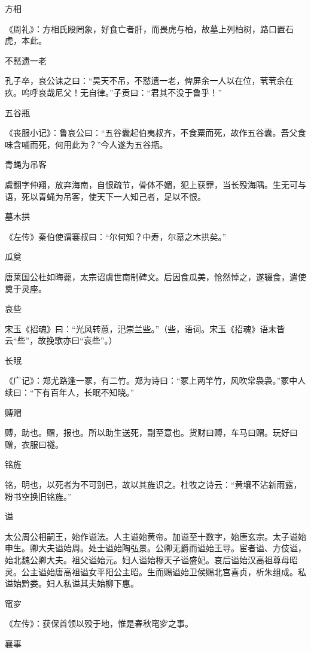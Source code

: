 \documentclass[a4paper,12pt,UTF8,twoside]{ctexbook}
\begin{document}
    方相
    
    《周礼》：方相氏殴罔象，好食亡者肝，而畏虎与柏，故墓上列柏树，路口置石虎，本此。
    
    不慭遗一老
    
    孔子卒，哀公诔之曰：“昊天不吊，不慭遗一老，俾屏余一人以在位，茕茕余在疚。呜呼哀哉尼父！无自律。”子贡曰：“君其不没于鲁乎！”
    
    五谷瓶
    
    《丧服小记》：鲁哀公曰：“五谷囊起伯夷叔齐，不食粟而死，故作五谷囊。吾父食味含哺而死，何用此为？”今人遂为五谷瓶。
    
    青蝇为吊客
    
    虞翻字仲翔，放弃海南，自恨疏节，骨体不媚，犯上获罪，当长殁海隅。生无可与语，死以青蝇为吊客，使天下一人知己者，足以不恨。
    
    墓木拱
    
    《左传》秦伯使谓褰叔曰：“尔何知？中寿，尔墓之木拱矣。”
    
    瓜奠
    
    唐莱国公杜如晦薨，太宗诏虞世南制碑文。后因食瓜美，怆然悼之，遂辍食，遣使奠于灵座。
    
    哀些
    
    宋玉《招魂》曰：“光风转蕙，汜崇兰些。”（些，语词。宋玉《招魂》语末皆云“些”，故挽歌亦曰“哀些”。）
    
    长眠
    
    《广记》：郑尤路逢一冢，有二竹。郑为诗曰：“冢上两竿竹，风吹常袅袅。”冢中人续曰：“下有百年人，长眠不知晓。”
    
    赙赗
    
    赙，助也。赗，报也。所以助生送死，副至意也。货财曰赙，车马曰赗。玩好曰赠，衣服曰襚。
    
    铭旌
    
    铭，明也，以死者为不可别已，故以其旌识之。杜牧之诗云：“黄壤不沾新雨露，粉书空换旧铭旌。”
    
    谥
    
    太公周公相嗣王，始作谥法。人主谥始黄帝。加谥至十数字，始唐玄宗。太子谥始申生。卿大夫谥始周。处士谥始陶弘景。公卿无爵而谥始王导。宦者谥、方伎谥，始北魏公卿大夫。祖父谥始元。妇人谥始穆天子谥盛妃。哀后谥始汉高祖尊母昭灵。公主谥始唐高祖谥女平阳公主昭。生而赐谥始卫侯赐北宫喜贞，析朱组成。私谥始黔娄。妇人私谥其夫始柳下惠。
    
    窀穸
    
    《左传》：获保首领以殁于地，惟是春秋窀穸之事。
    
    襄事
    
\end{document}
